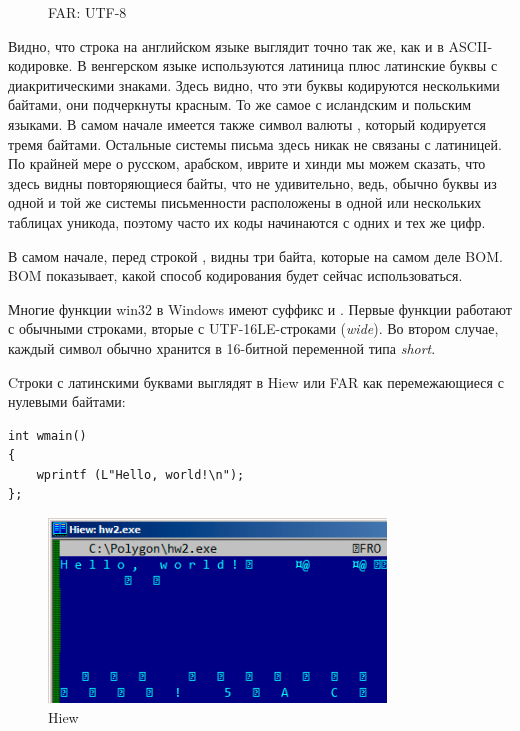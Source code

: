 \begin{figure}[H]
\centering
{}
\caption{FAR: UTF-8}
\end{figure}

Видно, что строка на английском языке выглядит точно так же, как и в ASCII-кодировке.
В венгерском языке используются латиница плюс латинские буквы с диакритическими знаками.
Здесь видно, что эти буквы кодируются несколькими байтами, они подчеркнуты красным.
То же самое с исландским и польским языками.
В самом начале имеется также символ валюты , который кодируется тремя байтами.
Остальные системы письма здесь никак не связаны с латиницей.
По крайней мере о русском, арабском, иврите и хинди мы можем сказать, что здесь видны повторяющиеся
байты, что не удивительно, ведь, обычно буквы из одной и той же системы письменности расположены в одной
или нескольких таблицах уникода, поэтому часто их коды начинаются с одних и тех же цифр.

В самом начале, перед строкой , видны три байта, которые на самом деле \ac{BOM}.
\ac{BOM} показывает, какой способ кодирования будет сейчас использоваться.


Многие функции win32 в Windows имеют суффикс  и .
Первые функции работают с обычными строками, вторые с UTF-16LE-строками (\emph{wide}).
Во втором случае, каждый символ обычно хранится в 16-битной переменной типа \emph{short}.

Cтроки с латинскими буквами выглядят в Hiew или FAR как перемежающиеся с нулевыми байтами:

\begin{lstlisting}[style=customc]
int wmain()
{
	wprintf (L"Hello, world!\n");
};
\end{lstlisting}

\begin{figure}[H]
\centering
\includegraphics[width=0.8\textwidth]{digging_into_code/strings/UTF16-string.png}
\caption{Hiew}
\end{figure}

